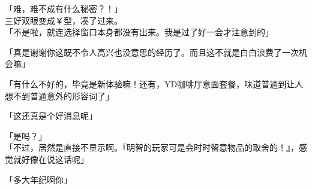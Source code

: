 「难，难不成有什么秘密？！」\\

三好双眼变成￥型，凑了过来。\\

「不是啦，就连选择窗口本身都没有出来。我是过了好一会才注意到的」

「真是谢谢你这既不令人高兴也没意思的经历了。而且这不就是白白浪费了一次机会嘛」

「有什么不好的，毕竟是新体验嘛！还有，YD咖啡厅意面套餐，味道普通到让人想不到普通意外的形容词了」

「这还真是个好消息呢」

「是吗？」\\

「不过，居然是直接不显示啊。『明智的玩家可是会时时留意物品的取舍的！』，感觉就好像在说这话呢」

「多大年纪啊你」\\
